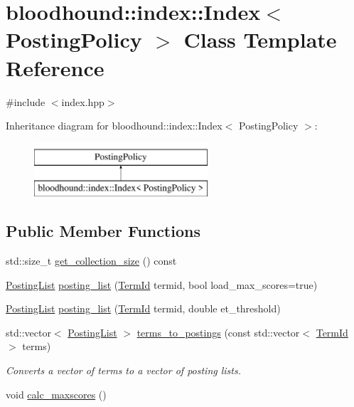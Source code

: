 \hypertarget{classbloodhound_1_1index_1_1Index}{}\section{bloodhound\+:\+:index\+:\+:Index$<$ Posting\+Policy $>$ Class Template Reference}
\label{classbloodhound_1_1index_1_1Index}


{\ttfamily \#include $<$index.\+hpp$>$}

Inheritance diagram for bloodhound\+:\+:index\+:\+:Index$<$ Posting\+Policy $>$\+:\begin{figure}[H]
\begin{center}
\leavevmode
\includegraphics[height=2.000000cm]{classbloodhound_1_1index_1_1Index}
\end{center}
\end{figure}
\subsection*{Public Member Functions}
\begin{DoxyCompactItemize}
\item 
std\+::size\+\_\+t \mbox{\hyperlink{classbloodhound_1_1index_1_1Index_aead1eb965d1607d25398b874cbd8a269}{get\+\_\+collection\+\_\+size}} () const
\item 
\mbox{\hyperlink{classbloodhound_1_1PostingList}{Posting\+List}} \mbox{\hyperlink{classbloodhound_1_1index_1_1Index_a24cadb41178b2cc81cf8f3e32a5dd516}{posting\+\_\+list}} (\mbox{\hyperlink{structbloodhound_1_1TermId}{Term\+Id}} termid, bool load\+\_\+max\+\_\+scores=true)
\item 
\mbox{\hyperlink{classbloodhound_1_1PostingList}{Posting\+List}} \mbox{\hyperlink{classbloodhound_1_1index_1_1Index_ac26271e4e2678e77d46017a24ed7eac5}{posting\+\_\+list}} (\mbox{\hyperlink{structbloodhound_1_1TermId}{Term\+Id}} termid, double et\+\_\+threshold)
\item 
std\+::vector$<$ \mbox{\hyperlink{classbloodhound_1_1PostingList}{Posting\+List}} $>$ \mbox{\hyperlink{classbloodhound_1_1index_1_1Index_ae36f606ee2206c44d44d0a11ae91b04c}{terms\+\_\+to\+\_\+postings}} (const std\+::vector$<$ \mbox{\hyperlink{structbloodhound_1_1TermId}{Term\+Id}} $>$ terms)
\begin{DoxyCompactList}\small\item\em Converts a vector of terms to a vector of posting lists. \end{DoxyCompactList}\item 
void \mbox{\hyperlink{classbloodhound_1_1index_1_1Index_a00eb8ae8cf8f24430fe170095c4aa4d9}{calc\+\_\+maxscores}} ()
\end{DoxyCompactItemize}
